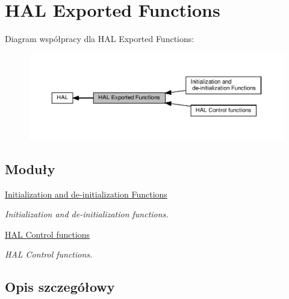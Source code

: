 \hypertarget{group___h_a_l___exported___functions}{}\section{H\+AL Exported Functions}
\label{group___h_a_l___exported___functions}
Diagram współpracy dla H\+AL Exported Functions\+:\nopagebreak
\begin{figure}[H]
\begin{center}
\leavevmode
\includegraphics[width=350pt]{group___h_a_l___exported___functions}
\end{center}
\end{figure}
\subsection*{Moduły}
\begin{DoxyCompactItemize}
\item 
\hyperlink{group___h_a_l___exported___functions___group1}{Initialization and de-\/initialization Functions}
\begin{DoxyCompactList}\small\item\em Initialization and de-\/initialization functions. \end{DoxyCompactList}\item 
\hyperlink{group___h_a_l___exported___functions___group2}{H\+A\+L Control functions}
\begin{DoxyCompactList}\small\item\em H\+AL Control functions. \end{DoxyCompactList}\end{DoxyCompactItemize}


\subsection{Opis szczegółowy}
